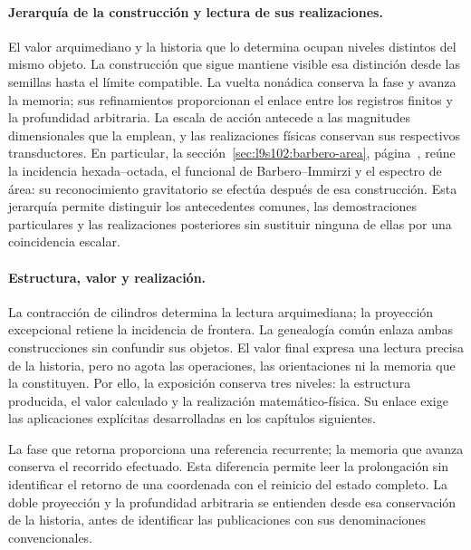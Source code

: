 \paragraph{Jerarquía de la construcción y lectura de sus realizaciones.}
El valor arquimediano y la historia que lo determina ocupan niveles
distintos del mismo objeto. La construcción que sigue mantiene visible esa
distinción desde las semillas hasta el límite compatible. La vuelta
nonádica conserva la fase y avanza la memoria; sus refinamientos proporcionan
el enlace entre los registros finitos y la profundidad arbitraria.
La escala de acción antecede a las magnitudes dimensionales que la emplean,
y las realizaciones físicas conservan sus respectivos transductores.
En particular, la sección~\ref{sec:l9s102:barbero-area},
página~\pageref{sec:l9s102:barbero-area}, reúne la incidencia
hexada--octada, el funcional de Barbero--Immirzi y el espectro de área:
su reconocimiento gravitatorio se efectúa después de esa construcción.
Esta jerarquía permite distinguir los antecedentes comunes, las
demostraciones particulares y las realizaciones posteriores sin sustituir
ninguna de ellas por una coincidencia escalar.

\paragraph{Estructura, valor y realización.}
La contracción de cilindros determina la lectura arquimediana; la
proyección excepcional retiene la incidencia de frontera. La genealogía
común enlaza ambas construcciones sin confundir sus objetos. El valor final
expresa una lectura precisa de la historia, pero no agota las operaciones,
las orientaciones ni la memoria que la constituyen. Por ello, la exposición
conserva tres niveles: la estructura producida, el valor calculado y la
realización matemático-física. Su enlace exige las aplicaciones explícitas
desarrolladas en los capítulos siguientes.

La fase que retorna proporciona una referencia recurrente; la memoria que
avanza conserva el recorrido efectuado. Esta diferencia permite leer la
prolongación sin identificar el retorno de una coordenada con el reinicio
del estado completo. La doble proyección y la profundidad arbitraria se
entienden desde esa conservación de la historia, antes de identificar las
publicaciones con sus denominaciones convencionales.

